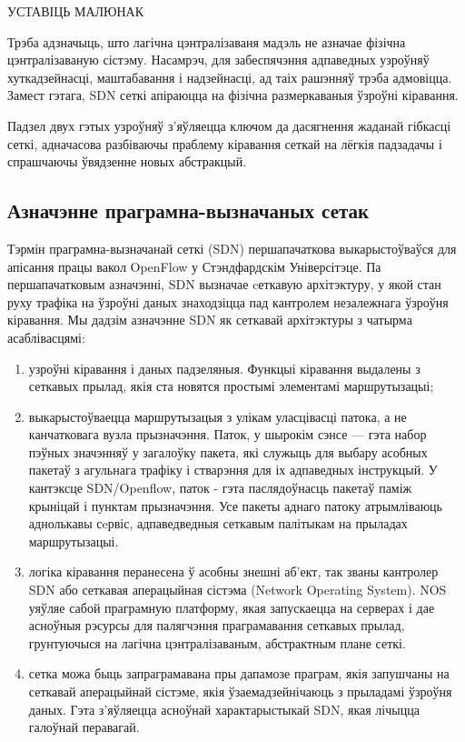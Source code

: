 \begin{center}
УСТАВІЦЬ МАЛЮНАК
\end{center}

Трэба адзначыць, што лагічна цэнтралізаваня мадэль не азначае фізічна цэнтралізаваную сістэму.
Насамрэч, для забеспячэння адпаведных узроўняў хуткадзейнасці, маштабавання і надзейнасці,
ад таіх рашэнняў трэба адмовіцца. Замест гэтага, SDN сеткі апіраюцца на фізічна размеркаваныя
ўзроўні кіравання.

Падзел двух гэтых узроўняў з'яўляецца ключом да дасягнення жаданай гібкасці сеткі,
адначасова разбіваючы праблему кіравання сеткай на лёгкія падзадачы і спрашчаючы ўвядзенне новых абстракцый.

\subsection{Азначэнне праграмна-вызначаных сетак}

Тэрмін праграмна-вызначанай сеткі (SDN) першапачаткова выкарыстоўваўся для апісання
працы вакол OpenFlow у Стэндфардскім Універсітэце.
Па першапачатковым азначэнні, SDN вызначае
cеткавую архітэктуру, у якой стан руху трафіка на ўзроўні даных
знаходзіцца пад кантролем  незалежнага ўзроўня кіравання.
Мы дадзім азначэнне SDN як сеткавай архітэктуры з
чатырма асаблівасцямі:
\begin{enumerate}
    \item узроўні кіравання і даных падзеляныя. Функцыі кіравання выдалены з сеткавых прылад, якія ста
новятся простымі элементамі маршрутызацыі;
    \item выкарыстоўваецца маршрутызацыя з улікам уласцівасці патока, а не канчатковага вузла прызначэння. Паток, у шырокім сэнсе --- гэта набор пэўных значэнняў у загалоўку пакета,
які служыць для выбару асобных пакетаў з агульнага трафіку і стварэння для іх адпаведных інструкцый.
У кантэксце SDN/Openflow, паток - гэта паслядоўнасць пакетаў паміж крыніцай і пунктам прызначэння.
Усе пакеты аднаго патоку атрымліваюць аднолькавы сeрвіс, адпаведведныя сеткавым палітыкам на прыладах маршрутызацыі.
    \item логіка кіравання перанесена ў асобны знешні аб'ект, так званы кантролер SDN або сеткавая аперацыйная сістэма (Network Operating System). NOS уяўляе сабой праграмную платформу, якая запускаецца на серверах і дае асноўныя рэсурсы для палягчэння праграмавання сеткавых прылад, грунтуючыся на лагічна
цэнтралізаваным, абстрактным плане сеткі.
    \item сетка можа быць запраграмавана пры дапамозе праграм, якія запушчаны на
    сеткавай аперацыйнай сістэме, якія ўзаемадзейнічаюць з прыладамі ўзроўня даных.
    Гэта з'яўляецца асноўнай характарыстыкай SDN, якая лічыцца галоўнай перавагай.
\end{enumerate}

